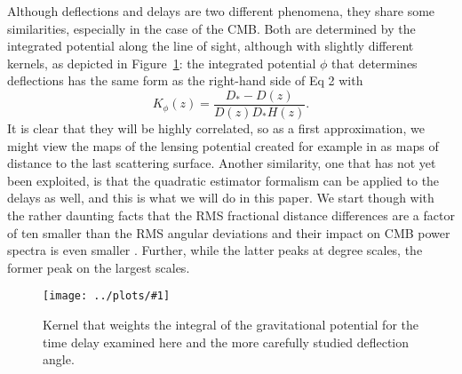 \documentclass[prl,amsmath,amssymb,floatfix,superscriptaddress,nofootinbib,twocolumn]{revtex4-1}
\def\be{\begin{equation}}
\def\ee{\end{equation}}
\newcommand{\sfig}[2]{
\texttt{[image: ../plots/\#1]}
        }
\newcommand{\Sfig}[2]{
   \begin{figure}[thbp]
   \begin{center}
    \sfig{#1.pdf}{\columnwidth}
    \caption{{\small #2}}
    \label{fig:#1}
     \end{center}
   \end{figure}
}
\newcommand{\rf}[1]{\ref{fig:#1}}
\newcommand{\scott}[1]{{\color{darkgreen} SD: #1}}
\newcommand{\wh}[1]{{\color{red} WH: #1}}
\begin{document}
Although deflections and delays are two different phenomena, they share some similarities, especially in the case of the CMB. Both are determined by the integrated potential along the line of sight, although with slightly different kernels, as depicted in Figure~\rf{kernel}: the integrated potential $\phi$ that determines deflections has the same form as the right-hand side of Eq 2 with
\be
K_\phi(z) = \frac{D_*-D(z)}{ D(z) D_* H(z)} .
\ee
It is clear that they will be highly correlated, so as a first approximation, we might view the maps of the lensing potential created for example in \citet{Aghanim:2018oex} as maps of distance to the last scattering surface. Another similarity, one that has not yet been exploited, is that the quadratic estimator formalism  \cite{Hu:2001tn} can be applied to the delays as well, and this is what we will do in this paper.  We start though with the rather daunting facts that the RMS fractional distance differences are a factor of ten smaller than the RMS angular deviations 
 and their impact on CMB power spectra is even smaller \cite{Hu:2001yq}. Further, while the latter peaks at degree scales, the former peak on the largest scales.

\Sfig{kernel}{Kernel that weights the integral of the gravitational potential for the time delay examined here and the more carefully studied deflection angle.}
\end{document}
